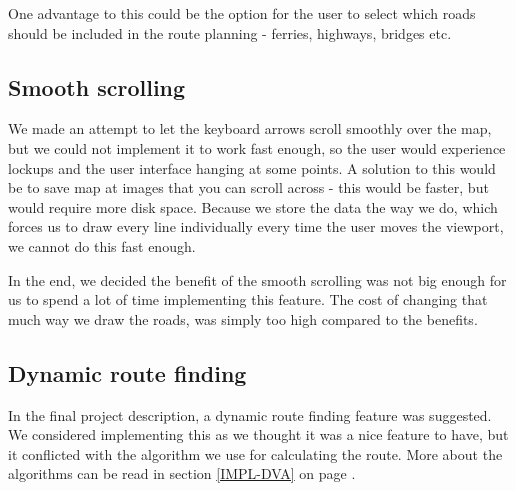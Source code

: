 One advantage to this could be the option for the user to select which roads
should be included in the route planning - ferries, highways, bridges etc. 

\subsection{Smooth scrolling}
\label{UIA-NI-SS}
We made an attempt to let the keyboard arrows scroll smoothly over the map, but
we could not implement it to work fast enough, so the user would experience
lockups and the user interface hanging at some points. A solution to this would
be to save map at images that you can scroll across - this would be faster, but
would require more disk space. Because we store the data the way we do, which 
forces us to draw every line individually every time the user moves the viewport, 
we cannot do this fast enough.

In the end, we decided the benefit of the smooth scrolling was not big enough
for us to spend a lot of time implementing this feature. The cost of changing that  
much way we draw the roads, was simply too high compared to the benefits.

\subsection{Dynamic route finding}
\label{UIA-NI-DRF}
In the final project description, a dynamic route finding feature was
suggested. We considered implementing this as we thought it was a nice feature
to have, but it conflicted with the algorithm we use for calculating the route.
More about the algorithms can be read in section \ref{IMPL-DVA}
 on page \pageref{IMPL-DVA}.

